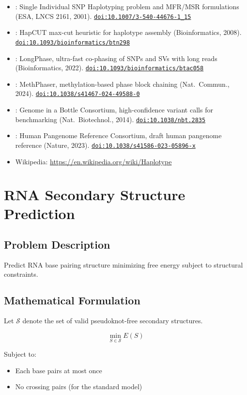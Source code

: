 \documentclass[11pt]{article}
\newcommand{\doi}[1]{\href{https://doi.org/#1}{\texttt{doi:#1}}}
\begin{document}
\begin{itemize}[noitemsep]
  \item \cite{Lancia2001}: Single Individual SNP Haplotyping problem and MFR/MSR 
    formulations (ESA, LNCS 2161, 2001). \doi{10.1007/3-540-44676-1\_15}
  \item \cite{BansalBafna2008}: HapCUT max-cut heuristic for haplotype assembly 
    (Bioinformatics, 2008). \doi{10.1093/bioinformatics/btn298}
  \item \cite{LongPhase2022}: LongPhase, ultra-fast co-phasing of SNPs and SVs with 
    long reads (Bioinformatics, 2022). \doi{10.1093/bioinformatics/btac058}
  \item \cite{MethPhaser2024}: MethPhaser, methylation-based phase block chaining 
    (Nat.\ Commun., 2024). \doi{10.1038/s41467-024-49588-0}
  \item \cite{GIAB2014}: Genome in a Bottle Consortium, high-confidence variant
    calls for benchmarking (Nat.\ Biotechnol., 2014). \doi{10.1038/nbt.2835}
  \item \cite{HPRC2023}: Human Pangenome Reference Consortium, draft human pangenome
    reference (Nature, 2023). \doi{10.1038/s41586-023-05896-x}
  \item Wikipedia: \url{https://en.wikipedia.org/wiki/Haplotype}
\end{itemize}

\section{RNA Secondary Structure Prediction}

\subsection*{Problem Description}

Predict RNA base pairing structure minimizing free energy subject to structural
constraints.

\subsection*{Mathematical Formulation}

Let $\mathcal{S}$ denote the set of valid pseudoknot-free secondary structures.

\[
\min_{S \in \mathcal{S}} E(S)
\]

Subject to:
\begin{itemize}[noitemsep]
    \item Each base pairs at most once
    \item No crossing pairs (for the standard model)
\end{itemize}
\end{document}
